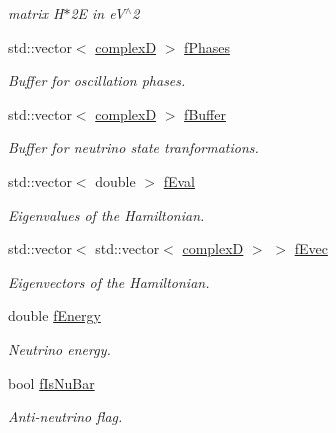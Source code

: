 \begin{DoxyCompactItemize}
\begin{DoxyCompactList}\small\item\em matrix H$\ast$2E in e\+V$^\wedge$2 \end{DoxyCompactList}\item 
std\+::vector$<$ \hyperlink{EigenPoint_8h_a67ca8e107e20610c3fff78d5e726ece0}{complexD} $>$ \hyperlink{classOscProb_1_1PMNS__Base_ab8d26b722047d49d977f5f2d83026ede}{f\+Phases}
\begin{DoxyCompactList}\small\item\em Buffer for oscillation phases. \end{DoxyCompactList}\item 
std\+::vector$<$ \hyperlink{EigenPoint_8h_a67ca8e107e20610c3fff78d5e726ece0}{complexD} $>$ \hyperlink{classOscProb_1_1PMNS__Base_a5440bc3efa466a37649601abce559e3e}{f\+Buffer}
\begin{DoxyCompactList}\small\item\em Buffer for neutrino state tranformations. \end{DoxyCompactList}\item 
std\+::vector$<$ double $>$ \hyperlink{classOscProb_1_1PMNS__Base_a6319c34d7decbb9d7d6da279c06e8c2d}{f\+Eval}
\begin{DoxyCompactList}\small\item\em Eigenvalues of the Hamiltonian. \end{DoxyCompactList}\item 
std\+::vector$<$ std\+::vector$<$ \hyperlink{EigenPoint_8h_a67ca8e107e20610c3fff78d5e726ece0}{complexD} $>$ $>$ \hyperlink{classOscProb_1_1PMNS__Base_a87be137356c5f27ab83cab5e1298ef8f}{f\+Evec}
\begin{DoxyCompactList}\small\item\em Eigenvectors of the Hamiltonian. \end{DoxyCompactList}\item 
double \hyperlink{classOscProb_1_1PMNS__Base_a2800af6d436972f3e900867790c046b0}{f\+Energy}
\begin{DoxyCompactList}\small\item\em Neutrino energy. \end{DoxyCompactList}\item 
bool \hyperlink{classOscProb_1_1PMNS__Base_a0ebaeaefab36a3ff381c6293faedfdd6}{f\+Is\+Nu\+Bar}
\begin{DoxyCompactList}\small\item\em Anti-\/neutrino flag. \end{DoxyCompactList}\item 

\end{DoxyCompactItemize}
